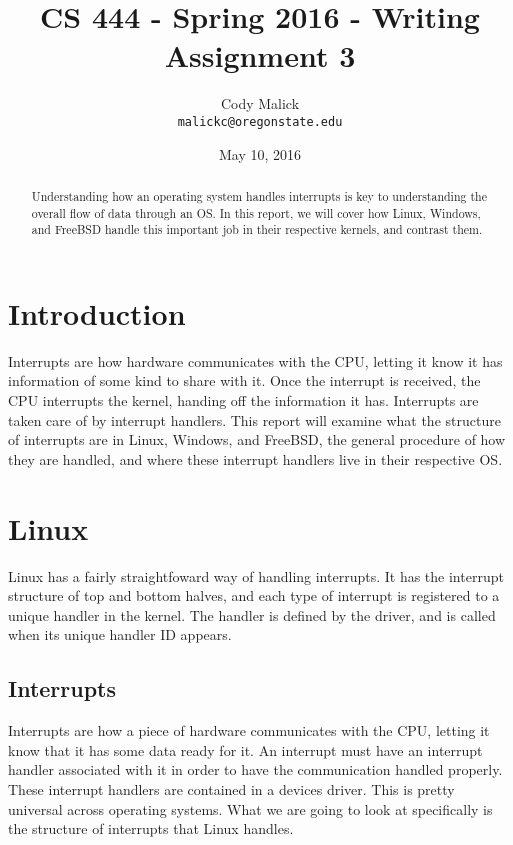 \documentclass[10pt,letterpaper,onecolumn,draftclsnofoot]{IEEEtran}
\begin{document}
  \begin{titlepage}
    \title{CS 444 - Spring 2016 - Writing Assignment 3}
    \author{Cody Malick\\
    \texttt{malickc@oregonstate.edu}}
    \date{May 10, 2016}
    \maketitle
    \vspace*{4cm}
    \begin{abstract}
      \noindent Understanding how an operating system handles interrupts is key
      to understanding the overall flow of data through an OS. In this report,
      we will cover how Linux, Windows, and FreeBSD handle this important job
      in their respective kernels, and contrast them.
    \end{abstract}
  \end{titlepage}

  \tableofcontents
  \clearpage
  \section{Introduction}
  Interrupts are how hardware communicates with the CPU, letting it know it
  has information of some kind to share with it. Once the interrupt is received,
  the CPU interrupts the kernel, handing off the information it has. Interrupts
  are taken care of by interrupt handlers. This report will examine what the structure of
  interrupts are in Linux, Windows, and FreeBSD, the general procedure of
  how they are handled, and where these interrupt handlers live in their
  respective OS.
  \section{Linux}
  Linux has a fairly straightfoward way of handling interrupts. It has the interrupt
  structure of top and bottom halves, and each type of interrupt is registered
  to a unique handler in the kernel. The handler is defined by the driver, and
  is called when its unique handler ID appears.

  \subsection{Interrupts}
  Interrupts are how a piece of hardware communicates with the CPU, letting it
  know that it has some data ready for it. An interrupt must have an interrupt
  handler associated with it in order to have the communication handled properly.
  These interrupt handlers are contained in a devices driver. This is pretty
  universal across operating systems. What we are going to look at specifically
  is the structure of interrupts that Linux handles. \cite{robertlove2010}
\end{document}
